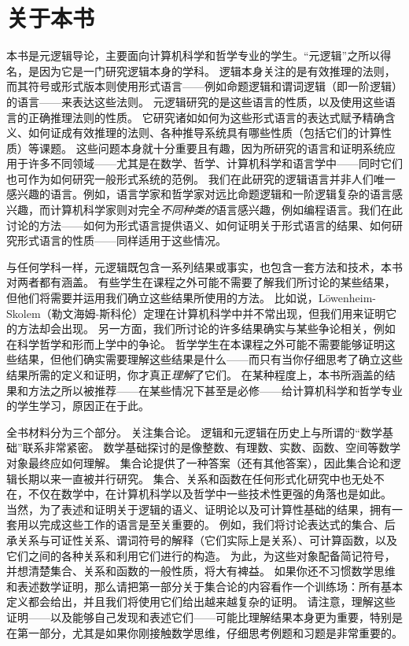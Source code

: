
\chapter{关于本书}

本书是元逻辑导论，主要面向计算机科学和哲学专业的学生。“元逻辑”之所以得名，是因为它是一门研究逻辑本身的学科。
逻辑本身关注的是有效推理的法则，而其符号或形式版本则使用形式语言——例如命题逻辑和谓词逻辑（即一阶逻辑）的语言——来表达这些法则。
元逻辑研究的是这些语言的性质，以及使用这些语言的正确推理法则的性质。
它研究诸如如何为这些形式语言的表达式赋予精确含义、如何证成有效推理的法则、各种推导系统具有哪些性质（包括它们的计算性质）等课题。
这些问题本身就十分重要且有趣，因为所研究的语言和证明系统应用于许多不同领域——尤其是在数学、哲学、计算机科学和语言学中——同时它们也可作为如何研究一般形式系统的范例。
我们在此研究的逻辑语言并非人们唯一感兴趣的语言。例如，语言学家和哲学家对远比命题逻辑和一阶逻辑复杂的语言感兴趣，而计算机科学家则对完全\emph{不同种类的}语言感兴趣，例如编程语言。我们在此讨论的方法——如何为形式语言提供语义、如何证明关于形式语言的结果、如何研究形式语言的性质——同样适用于这些情况。

与任何学科一样，元逻辑既包含一系列结果或事实，也包含一套方法和技术，本书对两者都有涵盖。
有些学生在课程之外可能不需要了解我们所讨论的某些结果，但他们将需要并运用我们确立这些结果所使用的方法。
比如说，Löwenheim-Skolem（勒文海姆-斯科伦）定理在计算机科学中并不常出现，但我们用来证明它的方法却会出现。
另一方面，我们所讨论的许多结果确实与某些争论相关，例如在科学哲学和形而上学中的争论。
哲学学生在本课程之外可能不需要能够证明这些结果，但他们确实需要理解这些结果是什么——而只有当你仔细思考了确立这些结果所需的定义和证明，你才真正\emph{理解}了它们。
在某种程度上，本书所涵盖的结果和方法之所以被推荐——在某些情况下甚至是必修——给计算机科学和哲学专业的学生学习，原因正在于此。

全书材料分为三个部分。 关注集合论。
逻辑和元逻辑在历史上与所谓的“数学基础”联系非常紧密。
数学基础探讨的是像整数、有理数、实数、函数、空间等数学对象最终应如何理解。
集合论提供了一种答案（还有其他答案），因此集合论和逻辑长期以来一直被并行研究。
集合、关系和函数在任何形式化研究中也无处不在，不仅在数学中，在计算机科学以及哲学中一些技术性更强的角落也是如此。
当然，为了表述和证明关于逻辑的语义、证明论以及可计算性基础的结果，拥有一套用以完成这些工作的语言是至关重要的。
例如，我们将讨论表达式的集合、后承关系与可证性关系、谓词符号的解释（它们实际上是关系）、可计算函数，以及它们之间的各种关系和利用它们进行的构造。
为此，为这些对象配备简记符号，并想清楚集合、关系和函数的一般性质，将大有裨益。
如果你还不习惯数学思维和表述数学证明，那么请把第一部分关于集合论的内容看作一个训练场：所有基本定义都会给出，并且我们将使用它们给出越来越复杂的证明。
请注意，理解这些证明——以及能够自己发现和表述它们——可能比理解结果本身更为重要，特别是在第一部分，尤其是如果你刚接触数学思维，仔细思考例题和习题是非常重要的。

